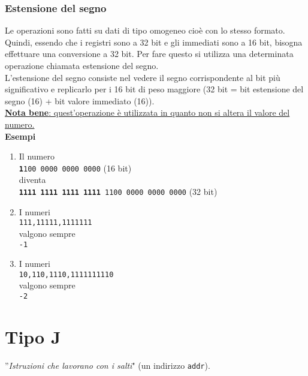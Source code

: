 \documentclass[../main.tex]{subfiles}
\begin{document}
\subsubsection*{Estensione del segno}
Le operazioni sono fatti su dati di tipo omogeneo
cioè con lo stesso formato. Quindi, essendo che i registri
sono a 32 bit e gli immediati sono a 16 bit, bisogna effettuare
una conversione a 32 bit. Per fare questo si utilizza una determinata operazione
chiamata estensione del segno.
\\[2mm]
L'estensione del segno consiste nel vedere il segno corrispondente al
bit più significativo e replicarlo per i 16 bit di peso maggiore
(32 bit = bit estensione del segno (16) + bit valore immediato (16)).
\\[2mm]
\underline{\textbf{Nota bene}: quest'operazione è utilizzata in quanto non si altera il valore
del numero.}
\\[5mm]
\textbf{Esempi}
\begin{enumerate}
    \item Il numero \\
    \hspace*{5mm}\texttt{\textbf{1}100 0000 0000 0000} (16 bit) \\
    diventa \\
    \hspace*{5mm}\texttt{\textbf{1111 1111 1111 1111} 1100 0000 0000 0000} (32 bit)

    \item I numeri \\
    \hspace*{5mm}\texttt{111,11111,1111111} \\
    valgono sempre \\
    \hspace*{5mm}\texttt{-1}

    \item I numeri \\
    \hspace*{5mm}\texttt{10,110,1110,1111111110} \\
    valgono sempre \\
    \hspace*{5mm}\texttt{-2}
\end{enumerate}

\newpage

\section{Tipo J}
''\textit{Istruzioni che lavorano con i salti}" (un indirizzo \texttt{addr}).
\end{document}
